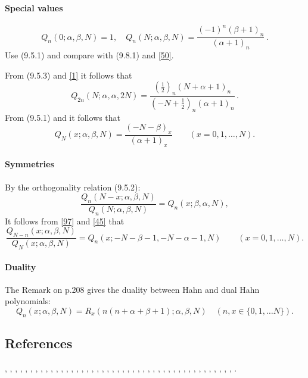 \documentclass[envcountchap,graybox]{svmono}
\newcounter{rom}
\newcommand\al\alpha
\newcommand\be\beta
\newcommand\thalf{\tfrac12}
\begin{document}
\paragraph{Special values}
\begin{equation}
Q_n(0;\al,\be,N)=1,\quad
Q_n(N;\al,\be,N)=\frac{(-1)^n(\be+1)_n}{(\al+1)_n}\,.
\label{95}
\end{equation}
Use (9.5.1) and compare with (9.8.1) and \eqref{50}.

From (9.5.3) and \eqref{1} it follows that
\begin{equation}
Q_{2n}(N;\al,\al,2N)=\frac{(\thalf)_n(N+\al+1)_n}{(-N+\thalf)_n(\al+1)_n}\,.
\label{30}
\end{equation}
From (9.5.1) and  it follows that
\begin{equation}
Q_N(x;\al,\be,N)=\frac{(-N-\be)_x}{(\al+1)_x}\qquad(x=0,1,\ldots,N).
\label{44}
\end{equation}
%
\paragraph{Symmetries}
By the orthogonality relation (9.5.2):
\begin{equation}
\frac{Q_n(N-x;\al,\be,N)}{Q_n(N;\al,\be,N)}=Q_n(x;\be,\al,N),
\label{96}
\end{equation}
It follows from \eqref{97} and \eqref{45} that
\begin{equation}
\frac{Q_{N-n}(x;\al,\be,N)}{Q_N(x;\al,\be,N)}
=Q_n(x;-N-\be-1,-N-\al-1,N)
\qquad(x=0,1,\ldots,N).
\label{100}
\end{equation}
%
\paragraph{Duality}
The Remark on p.208 gives the duality between Hahn and dual Hahn polynomials:
%
\begin{equation}
Q_n(x;\al,\be,N)=R_x(n(n+\al+\be+1);\al,\be,N)\quad(n,x\in\{0,1,\ldots N\}).
\label{45}
\end{equation}
%

\subsection*{References}
\cite{AlSalam90}, \cite{AndrewsAskey85}, \cite{Area+II}, \cite{Askey75},
\cite{Askey89I}, \cite{Askey2005}, \cite{AskeyGasper77}, \cite{AskeyWilson85},
\cite{AtakRahmanSuslov}, \cite{AtakSuslov88}, \cite{Chihara78},
\cite{Ciesielski}, \cite{Cooper+}, \cite{Dette95}, \cite{Dunkl76},
\cite{Dunkl78I}, \cite{Gasper73I}, \cite{Gasper74}, \cite{HoareRahman},
\cite{Ismail77}, \cite{Ismail2005II}, \cite{Karlin61}, \cite{Koorn81}, \cite{Koorn88},
\cite{LabelleYehI}, \cite{LabelleYehII}, \cite{Laine}, \cite{Lesky62},
\cite{Lesky88}, \cite{Lesky89}, \cite{Lesky94I}, \cite{Lesky95II},
\cite{LewanowiczII}, \cite{Neuman}, \cite{Nikiforov+}, \cite{NikiforovUvarov},
\cite{Rahman76III}, \cite{Rahman78I}, \cite{Rahman78II}, \cite{Rahman81III},
\cite{Sablonniere}, \cite{Stanton84}, \cite{Stanton90}, \cite{Wilson80}, \cite{Wilson70II},
\cite{Zarzo+}.
\end{document}
